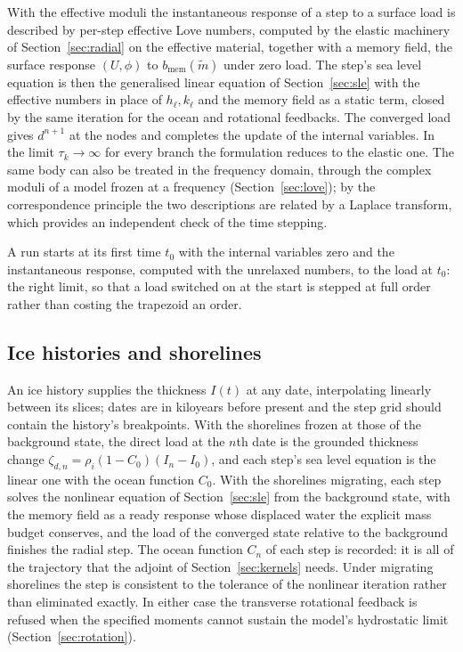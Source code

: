 \documentclass[11pt,a4paper]{article}
\numberwithin{equation}{section}
\begin{document}
With the effective moduli the instantaneous response of a step to a surface
load is described by per-step effective Love numbers, computed by the elastic
machinery of Section~\ref{sec:radial} on the effective material, together with a
memory field, the surface response $(U,\phi)$ to $b_{\mathrm{mem}}(\tilde m)$
under zero load. The step's sea level equation is then the generalised linear
equation of Section~\ref{sec:sle} with the effective numbers in place of
$h_{\ell},k_{\ell}$ and the memory field as a static term, closed by the same
iteration for the ocean and rotational feedbacks. The converged load gives
$d^{n+1}$ at the nodes and completes the update of the internal variables. In
the limit $\tau_{k}\to\infty$ for every branch the formulation reduces to the
elastic one. The same body can also be treated in the frequency domain, through
the complex moduli of a model frozen at a frequency
(Section~\ref{sec:love}); by the correspondence principle
\citep{WuPeltier1982} the two descriptions are related by a Laplace
transform, which provides an independent check of the time stepping.

A run starts at its first time $t_{0}$ with the internal variables zero and the
instantaneous response, computed with the unrelaxed numbers, to the load at
$t_{0}$: the right limit, so that a load switched on at the start is stepped at
full order rather than costing the trapezoid an order.

\subsection{Ice histories and shorelines}
\label{sec:shorelines}

An ice history supplies the thickness $I(t)$ at any date, interpolating
linearly between its slices; dates are in kiloyears before present and the
step grid should contain the history's breakpoints. With the shorelines frozen
at those of the background state, the direct load at the $n$th date is the
grounded thickness change $\zeta_{d,n} = \rho_{i}(1-C_{0})(I_{n}-I_{0})$, and
each step's sea level equation is the linear one with the ocean function
$C_{0}$. With the shorelines migrating, each step solves the nonlinear
equation of Section~\ref{sec:sle} from the background state, with the memory
field as a ready response whose displaced water the explicit mass budget
conserves, and the load of the converged state relative to the background
finishes the radial step. The ocean function $C_{n}$ of each step is recorded:
it is all of the trajectory that the adjoint of Section~\ref{sec:kernels}
needs. Under migrating shorelines the step is consistent to the tolerance of
the nonlinear iteration rather than eliminated exactly. In either case the
transverse rotational feedback is refused when the specified moments cannot
sustain the model's hydrostatic limit (Section~\ref{sec:rotation}).
\end{document}
